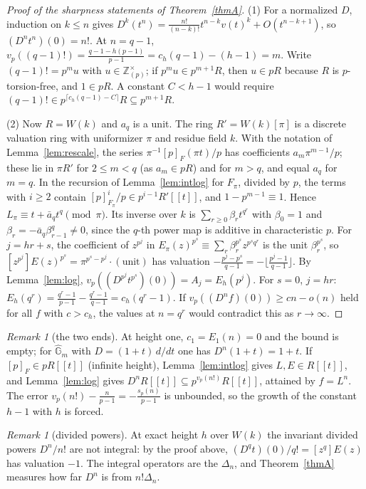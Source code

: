 \documentclass[11pt]{amsart}
\theoremstyle{definition}
\theoremstyle{remark}
\newtheorem{remark}[thm]{Remark}
\newcommand{\Z}{\mathbb Z}
\newcommand{\vp}{v_p}
\begin{document}
\begin{proof}[Proof of the sharpness statements of Theorem~\ref{thmA}]
(1) For a normalized $D$, induction on $k\le n$ gives $D^k(t^n)=\frac{n!}{(n-k)!}t^{n-k}v(t)^k+O(t^{n-k+1})$, so $(D^nt^n)(0)=n!$. At $n=q-1$, $\vp((q-1)!)=\frac{q-1-h(p-1)}{p-1}=c_h(q-1)-(h-1)=m$. Write $(q-1)!=p^mu$ with $u\in\Z_{(p)}^\times$; if $p^mu\in p^{m+1}R$, then $u\in pR$ because $R$ is $p$-torsion-free, and $1\in pR$. A constant $C<h-1$ would require $(q-1)!\in p^{\lceil c_h(q-1)-C\rceil}R\subseteq p^{m+1}R$.

(2) Now $R=W(k)$ and $a_q$ is a unit. The ring $R'=W(k)[\pi]$ is a discrete valuation ring with uniformizer $\pi$ and residue field $k$. With the notation of Lemma~\ref{lem:rescale}, the series $\pi^{-1}[p]_F(\pi t)/p$ has coefficients $a_m\pi^{m-1}/p$; these lie in $\pi R'$ for $2\le m<q$ (as $a_m\in pR$) and for $m>q$, and equal $a_q$ for $m=q$. In the recursion of Lemma~\ref{lem:intlog} for $F_\pi$, divided by $p$, the terms with $i\ge2$ contain $[p]_{F_\pi}^i/p\in p^{i-1}R'[[t]]$, and $1-p^{m-1}\equiv1$. Hence $L_\pi\equiv t+\bar a_qt^q\pmod{\pi}$. Its inverse over $k$ is $\sum_{r\ge0}\beta_rt^{q^r}$ with $\beta_0=1$ and $\beta_r=-\bar a_q\beta_{r-1}^q\ne0$, since the $q$-th power map is additive in characteristic $p$. For $j=hr+s$, the coefficient of $z^{p^j}$ in $E_\pi(z)^{p^s}\equiv\sum_r\beta_r^{p^s}z^{p^sq^r}$ is the unit $\beta_r^{p^s}$, so $[z^{p^j}]E(z)^{p^s}=\pi^{p^s-p^j}\cdot(\text{unit})$ has valuation $-\frac{p^j-p^s}{q-1}=-\lfloor\frac{p^j-1}{q-1}\rfloor$. By Lemma~\ref{lem:log}, $\vp((D^{p^j}t^{p^s})(0))=A_j=E_h(p^j)$. For $s=0$, $j=hr$: $E_h(q^r)=\frac{q^r-1}{p-1}-\frac{q^r-1}{q-1}=c_h(q^r-1)$. If $\vp((D^nf)(0))\ge cn-o(n)$ held for all $f$ with $c>c_h$, the values at $n=q^r$ would contradict this as $r\to\infty$.
\end{proof}

\begin{remark}[the two ends]
At height one, $c_1=E_1(n)=0$ and the bound is empty; for $\widehat{\mathbb G}_m$ with $D=(1+t)\,d/dt$ one has $D^n(1+t)=1+t$. If $[p]_F\in pR[[t]]$ (infinite height), Lemma~\ref{lem:intlog} gives $L,E\in R[[t]]$, and Lemma~\ref{lem:log} gives $D^nR[[t]]\subseteq p^{\vp(n!)}R[[t]]$, attained by $f=L^n$. The error $\vp(n!)-\frac n{p-1}=-\frac{s_p(n)}{p-1}$ is unbounded, so the growth of the constant $h-1$ with $h$ is forced.
\end{remark}

\begin{remark}[divided powers]
At exact height $h$ over $W(k)$ the invariant divided powers $D^n/n!$ are not integral: by the proof above, $(D^qt)(0)/q!=[z^q]E(z)$ has valuation $-1$. The integral operators are the $\Delta_n$, and Theorem~\ref{thmA} measures how far $D^n$ is from $n!\Delta_n$.
\end{remark}
\end{document}
